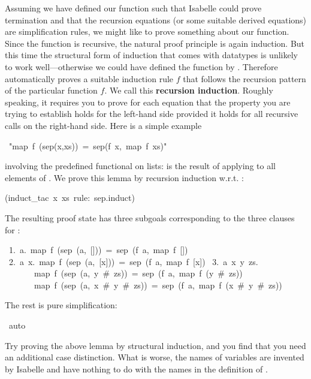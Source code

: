 \begin{isabelle}%
%
\begin{isamarkuptext}%
Assuming we have defined our function such that Isabelle could prove
termination and that the recursion equations (or some suitable derived
equations) are simplification rules, we might like to prove something about
our function. Since the function is recursive, the natural proof principle is
again induction. But this time the structural form of induction that comes
with datatypes is unlikely to work well---otherwise we could have defined the
function by . Therefore  automatically
proves a suitable induction rule $f$ that follows the
recursion pattern of the particular function $f$. We call this
\textbf{recursion induction}. Roughly speaking, it
requires you to prove for each  equation that the property
you are trying to establish holds for the left-hand side provided it holds
for all recursive calls on the right-hand side. Here is a simple example%
\end{isamarkuptext}%
~{"}map~f~(sep(x,xs))~=~sep(f~x,~map~f~xs){"}%
\begin{isamarkuptxt}%
\noindent
involving the predefined  functional on lists: 
is the result of applying  to all elements of . We prove
this lemma by recursion induction w.r.t. :%
\end{isamarkuptxt}%
(induct\_tac~x~xs~rule:~sep.induct)%
\begin{isamarkuptxt}%
\noindent
The resulting proof state has three subgoals corresponding to the three
clauses for :
\begin{isabellepar}%
~1.~{\isasymAnd}a.~map~f~(sep~(a,~[]))~=~sep~(f~a,~map~f~[])\isanewline
~2.~{\isasymAnd}a~x.~map~f~(sep~(a,~[x]))~=~sep~(f~a,~map~f~[x])\isanewline
~3.~{\isasymAnd}a~x~y~zs.\isanewline
~~~~~~~map~f~(sep~(a,~y~\#~zs))~=~sep~(f~a,~map~f~(y~\#~zs))~{\isasymLongrightarrow}\isanewline
~~~~~~~map~f~(sep~(a,~x~\#~y~\#~zs))~=~sep~(f~a,~map~f~(x~\#~y~\#~zs))%
\end{isabellepar}%
The rest is pure simplification:%
\end{isamarkuptxt}%
~auto%
\begin{isamarkuptext}%
Try proving the above lemma by structural induction, and you find that you
need an additional case distinction. What is worse, the names of variables
are invented by Isabelle and have nothing to do with the names in the
definition of .


\end{isamarkuptext}
\end{isabelle}
